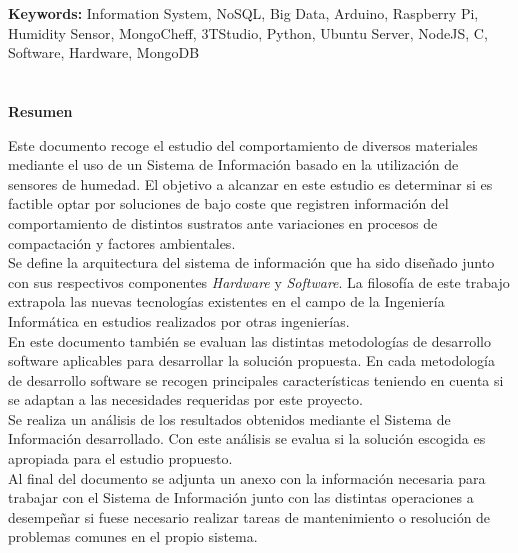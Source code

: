 
\newpage
\noindent
{\bf Keywords:\newline}
Information System, NoSQL, Big Data, Arduino, Raspberry Pi, Humidity Sensor, MongoCheff, 3TStudio, Python, Ubuntu Server, NodeJS, C, Software, Hardware, MongoDB

\thispagestyle{empty}
\newpage

\chapter*{}
\begin{center}
\textbf{Resumen}
\end{center}

Este documento recoge el estudio del comportamiento de diversos materiales mediante el uso de un Sistema de Información basado en la utilización de sensores de humedad. El objetivo a alcanzar en este estudio es determinar si es factible optar por soluciones de bajo coste que registren información del comportamiento de distintos sustratos ante variaciones en procesos de compactación y factores ambientales.\\

Se define la arquitectura del sistema de información que ha sido diseñado junto con sus respectivos componentes \textit{Hardware} y \textit{Software}. La filosofía de este trabajo extrapola las nuevas tecnologías existentes en el campo de la Ingeniería Informática en estudios realizados por otras ingenierías.\\

En este documento también se evaluan las distintas metodologías de desarrollo software aplicables para desarrollar la solución propuesta. En cada metodología de desarrollo software se recogen principales características teniendo en cuenta si se adaptan a las necesidades requeridas por este proyecto.\\

Se realiza un análisis de los resultados obtenidos mediante el Sistema de Información desarrollado. Con este análisis se evalua si la solución escogida es apropiada para el estudio propuesto.\\

Al final del documento se adjunta un anexo con la información necesaria para trabajar con el Sistema de Información junto con las distintas operaciones a desempeñar si fuese necesario realizar tareas de mantenimiento o resolución de problemas comunes en el propio sistema.


\thispagestyle{empty}

\newpage
\newpage
